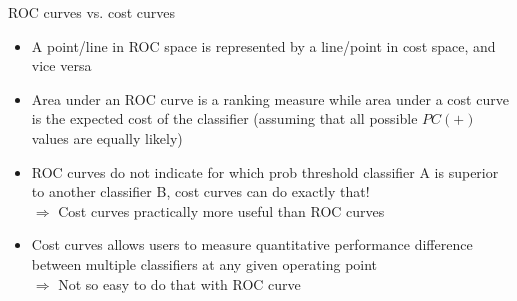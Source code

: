 \documentclass[11pt,compress,t,notes=noshow, xcolor=table]{beamer}
\begin{document}

\begin{vbframe}{ROC curves vs. cost curves}

\begin{itemize}
  \item A point/line in ROC space is represented by a line/point in cost space, and vice versa
  \item Area under an ROC curve is a ranking measure while area under a cost curve is the expected cost of the classifier (assuming that all possible $PC(+)$ values are equally likely)
  \item ROC curves do not indicate for which prob threshold classifier A is superior to another classifier B, cost curves can do exactly that!\\
  $\Rightarrow$ Cost curves practically more useful than ROC curves
  \item Cost curves allows users to measure quantitative performance difference between multiple classifiers at any given operating point \\
  $\Rightarrow$ Not so easy to do that with ROC curve
  \end{itemize}

\end{vbframe}

\end{document}
